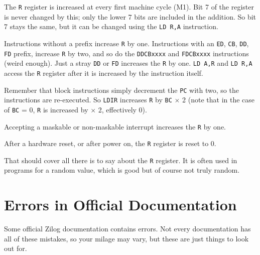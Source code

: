 The {\tt R} register is increased at every first machine cycle (M1). Bit 7 of the register is never changed by this; only the lower 7 bits are included in the addition. So bit 7 stays the same, but it can be changed using the
{\tt LD R,A} instruction.

Instructions without a prefix increase {\tt R} by one. Instructions with an {\tt ED}, {\tt CB}, {\tt DD}, {\tt FD} prefix, increase {\tt R} by two, and so do the {\tt DDCBxxxx} and {\tt FDCBxxxx} instructions (weird enough). Just a stray {\tt DD} or {\tt FD} increases the {\tt R} by one. {\tt LD A,R} and {\tt LD R,A} access the {\tt R} register after it is increased by the instruction itself. 

Remember that block instructions simply decrement the {\tt PC} with two, so the instructions are re-executed. So {\tt LDIR} increases {\tt R} by {\tt BC} $\times$ 2 (note that in the case of {\tt BC} = 0, {\tt R} is increased by  $\times$ 2, effectively 0).

Accepting a maskable or non-maskable interrupt increases the {\tt R} by one.

After a hardware reset, or after power on, the {\tt R} register is reset to 0.

That should cover all there is to say about the {\tt R} register. It is often used in programs for a random value, which is good but of course not truly random.


\pagebreak
\section{Errors in Official Documentation}

Some official Zilog documentation contains errors. Not every documentation has all of these mistakes, so your milage may vary, but these are just things to look out for.

